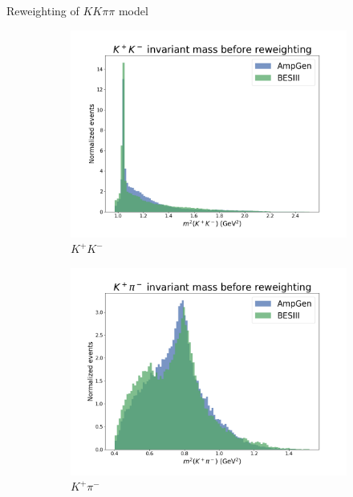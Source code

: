 \documentclass{beamer}
\begin{document}
\begin{frame}{Reweighting of \texorpdfstring{$KK\pi\pi$}{KKpipi} model}
  \begin{figure}
    \centering
    \begin{subfigure}{0.33\textwidth}
      \centering
      \includegraphics[width=\textwidth]{Plots/s01_BeforeReweighting.png}
      \caption{$K^+K^-$}
    \end{subfigure}%
    \begin{subfigure}{0.33\textwidth}
      \centering
      \includegraphics[width=\textwidth]{Plots/s03_BeforeReweighting.png}
      \caption{$K^+\pi^-$}
    \end{subfigure}%
    \begin{subfigure}{0.33\textwidth}

\end{subfigure}
\end{figure}
\end{frame}
\end{document}
